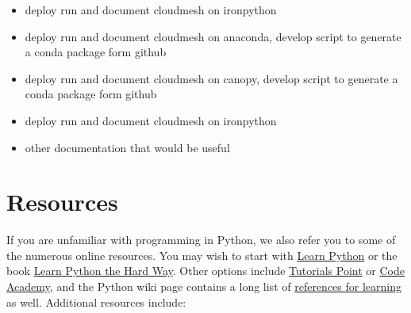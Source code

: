 \begin{itemize}

\item
  deploy run and document cloudmesh on ironpython
\item
  deploy run and document cloudmesh on anaconda, develop script to
  generate a conda package form github
\item
  deploy run and document cloudmesh on canopy, develop script to
  generate a conda package form github
\item
  deploy run and document cloudmesh on ironpython
\item
  other documentation that would be useful
\end{itemize}


\section{Resources}

If you are unfamiliar with programming in Python, we also refer you to
some of the numerous online resources. You may wish to start with
\href{https://www.learnpython.org}{Learn Python} or the book
\href{http://learnpythonthehardway.org/book/}{Learn Python the Hard
Way}. Other options include
\href{http://www.tutorialspoint.com/python/}{Tutorials Point} or
\href{http://www.codecademy.com/en/tracks/python}{Code Academy}, and the
Python wiki page contains a long list of
\href{https://wiki.python.org/moin/BeginnersGuide/Programmers}{references
for learning} as well. Additional resources include:


